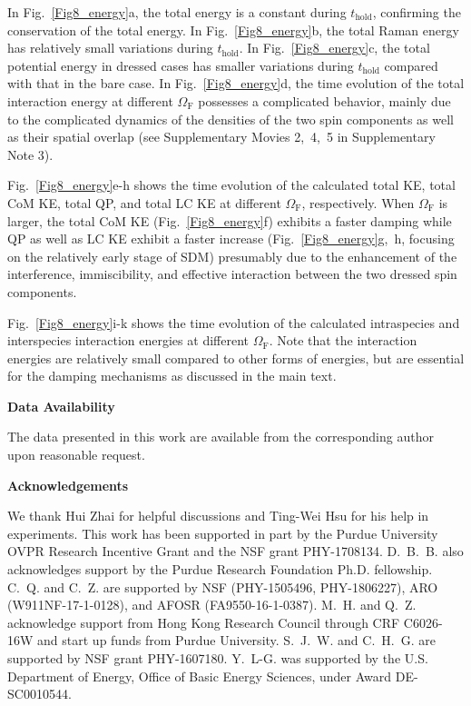 \documentclass[showpacs,preprintnumbers,amsmath,amssymb, superscriptaddress, aps, reprint]{revtex4-1}
\def\OmegaF{\Omega_{\text{F}}}
\def\thold{t_{\text{hold}}}
\begin{document}
{{{In {Fig.~{\ref{Fig8_energy}}a}, the total energy is a constant during $\thold$, confirming the conservation of the total energy. In {Fig.~{\ref{Fig8_energy}}b}, the total Raman energy has relatively small variations during $\thold$. 
In Fig.~{\ref{Fig8_energy}}c, the total potential energy in dressed cases has smaller variations during $\thold$ compared with that in the bare case.
In {Fig.~{\ref{Fig8_energy}}d}, the time evolution of the total interaction energy at different $\OmegaF$ possesses a complicated behavior, mainly due to the complicated dynamics of the densities of the two spin components as well as their spatial overlap (see Supplementary Movies 2,~4,~5 in Supplementary Note 3). 

{Fig.~{\ref{Fig8_energy}}e-h} shows the time evolution of the calculated total KE, total CoM KE, total QP, and total LC KE at different $\OmegaF$, respectively. When $\OmegaF$ is larger, the total CoM KE ({Fig.~{\ref{Fig8_energy}}f}) exhibits a faster damping while QP as well as LC KE exhibit a faster increase ({Fig.~{\ref{Fig8_energy}}g,~h}, focusing on the relatively early stage of SDM) presumably due to the enhancement of the interference, immiscibility, and effective interaction between the two dressed spin components.

{Fig.~{\ref{Fig8_energy}}i-k} shows the time evolution of the calculated intraspecies and interspecies interaction energies at different $\OmegaF$. Note that the interaction energies are relatively small compared to other forms of energies, but are essential for the damping mechanisms as discussed in the main text.


\vspace{5mm}
\centerline{\textbf{Data Availability}}
The data presented in this work are available from the corresponding author upon reasonable request.



\vspace{5mm}
\centerline{\textbf{Acknowledgements}}
We thank Hui Zhai for helpful discussions and Ting-Wei Hsu for his help in experiments. This work has been supported in part by the Purdue University OVPR Research Incentive Grant and the NSF grant PHY-1708134. D.~B.~B. also acknowledges support by the Purdue Research Foundation Ph.D. fellowship. C.~Q. and C.~Z. are supported by NSF (PHY-1505496, PHY-1806227), ARO (W911NF-17-1-0128), and AFOSR (FA9550-16-1-0387). M.~H. and Q.~Z. acknowledge support from Hong Kong Research Council through CRF C6026-16W and start up funds from Purdue University. S.~J.~W. and C.~H.~G. are supported by NSF grant PHY-1607180. Y.~L-G. was supported by the U.S. Department of Energy, Office of Basic Energy Sciences, under Award DE-SC0010544.


}}}
\end{document}
